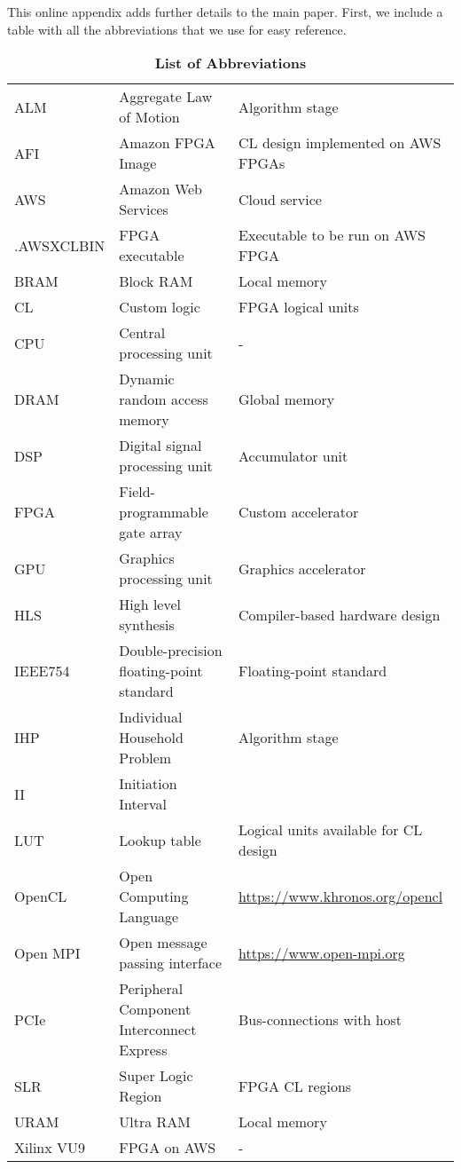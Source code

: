 \documentclass[12pt,american]{article}
\begin{document}
This online appendix adds further details to the main paper. First, we include a table with all the abbreviations that we use for easy reference.

\begin{table}[ht!]
\caption{\textbf{List of Abbreviations}}
\noindent
\begin{footnotesize}
\begin{tabular}{lll}
\toprule
ALM & Aggregate Law of Motion & Algorithm stage \\
AFI & Amazon FPGA Image & CL design implemented on AWS FPGAs \\
AWS & Amazon Web Services & Cloud service \\
.AWSXCLBIN & FPGA executable & Executable to be run on AWS FPGA\\
BRAM & Block RAM  & Local memory \\
CL & Custom logic & FPGA logical units\\ 
CPU & Central processing unit & - \\
DRAM & Dynamic random access memory & Global memory \\
DSP & Digital signal processing unit & Accumulator unit\\
FPGA & Field-programmable gate array& Custom accelerator \\
GPU & Graphics processing unit & Graphics accelerator \\
HLS & High level synthesis & Compiler-based hardware design\\
IEEE754 & Double-precision floating-point standard & Floating-point standard \\
IHP & Individual Household Problem & Algorithm stage\\ 
II & Initiation Interval & \\
LUT & Lookup table & Logical units available for CL design\\
OpenCL & Open Computing Language & \url{https://www.khronos.org/opencl}\\ 
Open MPI & Open message passing interface & \url{https://www.open-mpi.org}\\
PCIe & Peripheral Component Interconnect Express & Bus-connections with host  \\
SLR & Super Logic Region & FPGA CL regions \\
URAM & Ultra RAM & Local memory \\
Xilinx VU9 & FPGA on AWS & - \\
\bottomrule
\end{tabular}
\end{footnotesize}
\label{tab:acronyms}
\end{table}
\end{document}
